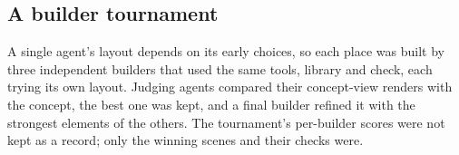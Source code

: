 \subsection{A builder tournament}\label{a-builder-tournament}

A single agent's layout depends on its early choices, so each place was built by three independent builders that used the same tools, library and check, each trying its own layout. Judging agents compared their concept-view renders with the concept, the best one was kept, and a final builder refined it with the strongest elements of the others. The tournament's per-builder scores were not kept as a record; only the winning scenes and their checks were.
